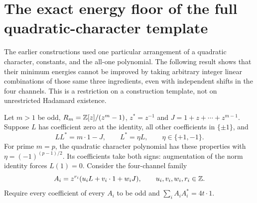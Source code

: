 \section{The exact energy floor of the full quadratic-character template}
The earlier constructions used one particular arrangement of a quadratic
character, constants, and the all-one polynomial. The following result
shows that their minimum energies cannot be improved by taking arbitrary
integer linear combinations of those same three ingredients, even with
independent shifts in the four channels. This is a restriction on a
construction template, not on unrestricted Hadamard existence.

Let $m>1$ be odd, $R_m=\mathbb Z[z]/(z^m-1)$, $z^*=z^{-1}$ and
$J=1+z+\cdots+z^{m-1}$. Suppose $L$ has coefficient zero at the
identity, all other coefficients in $\{\pm1\}$, and
\[
 LL^*=m\cdot1-J,\qquad L^*=\eta L,\qquad \eta\in\{+1,-1\}.
\]
For prime $m=p$, the quadratic character polynomial has these
properties with $\eta=(-1)^{(p-1)/2}$. Its coefficients take both signs:
augmentation of the norm identity forces $L(1)=0$.
Consider the four-channel family
\begin{equation}\label{eq:fullspan}
 A_i=z^{r_i}(u_iL+v_i\cdot1+w_iJ),\qquad
 u_i,v_i,w_i,r_i\in\mathbb Z.
\end{equation}
Require every coefficient of every $A_i$ to be odd and
$\sum_iA_iA_i^*=4t\cdot1$.

